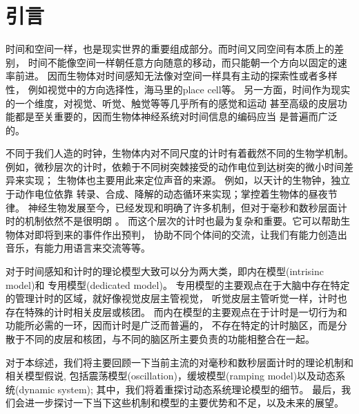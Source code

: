 \section{引言}

时间和空间一样，也是现实世界的重要组成部分。而时间又同空间有本质上的差别，
时间不能像空间一样朝任意方向随意的移动，而只能朝一个方向以固定的速率前进。
因而生物体对时间感知无法像对空间一样具有主动的探索性或者多样性，
例如视觉中的方向选择性，海马里的place cell等。
另一方面，时间作为现实的一个维度，对视觉、听觉、触觉等等几乎所有的感觉和运动
甚至高级的皮层功能都是至关重要的，因而生物体神经系统对时间信息的编码应当
是普遍而广泛的。

不同于我们人造的时钟，生物体内对不同尺度的计时有着截然不同的生物学机制。
例如，微秒层次的计时，依赖于不同树突棘接受的动作电位到达树突的微小时间差异来实现；
生物体也主要用此来定位声音的来源\cite{moiseff1981neuronal}。
例如，以天计的生物钟，独立于动作电位依靠
转录、合成、降解的动态循环来实现；掌控着生物体的昼夜节律\cite{panda2002circadian}。
神经生物发展至今，已经发现和明确了许多机制，但对于毫秒和数秒层面计时的机制依然不是很明朗
\cite{buonomano2007biology,paton2018neural}。
而这个层次的计时也最为复杂和重要。它可以帮助生物体对即将到来的事件作出预判，
协助不同个体间的交流，让我们有能力创造出音乐，有能力用语言来交流等等。

对于时间感知和计时的理论模型大致可以分为两大类，即内在模型(intrisinc model)和
专用模型(dedicated model)\cite{ivry2008dedicated,paton2018neural}。
专用模型的主要观点在于大脑中存在特定的管理计时的区域，就好像视觉皮层主管视觉，
听觉皮层主管听觉一样，计时也存在特殊的计时相关皮层或核团。
而内在模型的主要观点在于计时是一切行为和功能所必需的一环，因而计时是广泛而普遍的，
不存在特定的计时脑区，而是分散于不同的皮层和核团，与不同的脑区所主要负责的功能相整合在一起。


对于本综述，我们将主要回顾一下当前主流的对毫秒和数秒层面计时的理论机制和相关模型假说,
包括震荡模型(oscillation)，缓坡模型(ramping model)以及动态系统(dynamic system);
其中，我们将着重探讨动态系统理论模型的细节。
最后，我们会进一步探讨一下当下这些机制和模型的主要优势和不足，以及未来的展望。
